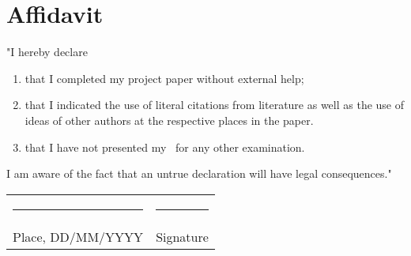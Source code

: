 
\newpage
\addsec{\listrefname} %


\printbibliography[nottype=online,heading=literatur]
\printbibliography[type=online,heading=www]


\newpage
\pagestyle{empty}

\section*{Affidavit}

\vspace{0.5cm}

"I hereby declare\\

\begin{enumerate}
	\item that I completed my project paper without external help;
	\item that I indicated the use of literal citations from literature as
	      well as the use of ideas of other authors at the respective
	      places in the paper.
	\item that I have not presented my \papertype \ for any other
	      examination.
\end{enumerate}

I am aware of the fact that an untrue declaration will have legal
consequences."
\\
\vspace{2.6cm}

\begin{tabular}{ p{} l}
\rule{0.4\textwidth}{1pt} & \rule{0.4\textwidth}{1pt}\\
Place, DD/MM/YYYY		  & Signature\\
\end{tabular}
\\




